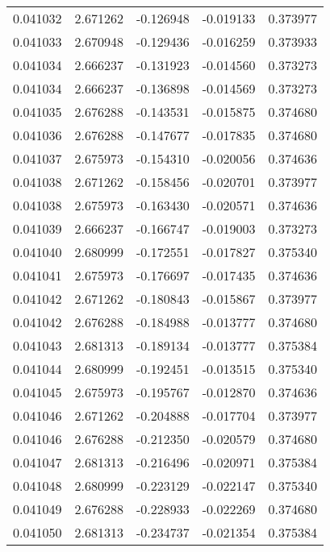 \begin{tabular}{lrrrr}
0.041032    &  2.671262 & -0.126948 & -0.019133 &             0.373977 \\
0.041033    &  2.670948 & -0.129436 & -0.016259 &             0.373933 \\
0.041034    &  2.666237 & -0.131923 & -0.014560 &             0.373273 \\
0.041034    &  2.666237 & -0.136898 & -0.014569 &             0.373273 \\
0.041035    &  2.676288 & -0.143531 & -0.015875 &             0.374680 \\
0.041036    &  2.676288 & -0.147677 & -0.017835 &             0.374680 \\
0.041037    &  2.675973 & -0.154310 & -0.020056 &             0.374636 \\
0.041038    &  2.671262 & -0.158456 & -0.020701 &             0.373977 \\
0.041038    &  2.675973 & -0.163430 & -0.020571 &             0.374636 \\
0.041039    &  2.666237 & -0.166747 & -0.019003 &             0.373273 \\
0.041040    &  2.680999 & -0.172551 & -0.017827 &             0.375340 \\
0.041041    &  2.675973 & -0.176697 & -0.017435 &             0.374636 \\
0.041042    &  2.671262 & -0.180843 & -0.015867 &             0.373977 \\
0.041042    &  2.676288 & -0.184988 & -0.013777 &             0.374680 \\
0.041043    &  2.681313 & -0.189134 & -0.013777 &             0.375384 \\
0.041044    &  2.680999 & -0.192451 & -0.013515 &             0.375340 \\
0.041045    &  2.675973 & -0.195767 & -0.012870 &             0.374636 \\
0.041046    &  2.671262 & -0.204888 & -0.017704 &             0.373977 \\
0.041046    &  2.676288 & -0.212350 & -0.020579 &             0.374680 \\
0.041047    &  2.681313 & -0.216496 & -0.020971 &             0.375384 \\
0.041048    &  2.680999 & -0.223129 & -0.022147 &             0.375340 \\
0.041049    &  2.676288 & -0.228933 & -0.022269 &             0.374680 \\
0.041050    &  2.681313 & -0.234737 & -0.021354 &             0.375384 \\

\end{tabular}

